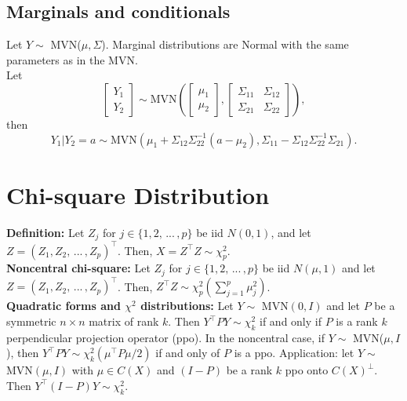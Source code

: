 \documentclass[letterpaper,11pt]{article}
\newcommand{\1}{\mathbf{1}} %
\begin{document}
\subsection{Marginals and conditionals}

Let $Y \sim$ MVN($\mu, \Sigma$). Marginal distributions are Normal with the same parameters as in the MVN. \\
 
Let
$$
\left[ \begin{array}{c} Y_1 \\ Y_2 \end{array} \right] \sim \text{MVN} \left( \left[ \begin{array}{c} \mu_1 \\ \mu_2 \end{array} \right] , \left[ \begin{array}{cc} \Sigma_{11} & \Sigma_{12} \\ \Sigma_{21} & \Sigma_{22} \end{array} \right] \right),
$$ 
then
$$
Y_1 | Y_2 = a \sim \text{MVN}(\mu_1 + \Sigma_{12}\Sigma^{-1}_{22}(a - \mu_2), \Sigma_{11} - \Sigma_{12}\Sigma^{-1}_{22}\Sigma_{21}).
$$

\section{Chi-square Distribution}


\textbf{Definition:} Let $Z_j$ for $j \in \{1, 2, \, ... \, , p\}$ be iid
$N(0,1)$, and let $Z = (Z_1, Z_2, \, ... \, , Z_p)^\intercal$. Then, $X = Z^\intercal Z \sim \chi^2_p$.  \\

\textbf{Noncentral chi-square:} Let
$Z_j$ for $j \in \{1, 2, \, ... \, , p\}$ be iid $N(\mu,1)$ and let $Z
= (Z_1, Z_2, \, ... \, , Z_p)^\intercal$. Then, $Z^\intercal Z \sim \chi^2_p(\sum_{j=1}^p \mu^2_j)$. \\

\textbf{Quadratic forms and $\chi^2$ distributions:} Let $Y \sim$
MVN$(0, I)$ and let $P$ be a symmetric $n \times n$ matrix of rank
$k$. Then $Y^\intercal P Y \sim \chi^2_{k}$ if and only if $P$ is a
rank $k$ perpendicular projection operator (ppo). In the noncentral case, if $Y
\sim$ MVN($\mu, I$), then $Y^\intercal P Y \sim
\chi^2_{k}(\mu^\intercal P \mu/2)$ if and only of $P$ is a
ppo. Application: let $Y \sim$ MVN$(\mu, I)$ with
$\mu \in C(X)$ and $(I-P)$ be a rank $k$ ppo onto $C(X)^\perp$. Then
$Y^\intercal (I-P) Y \sim \chi^2_k$. 
\end{document}
